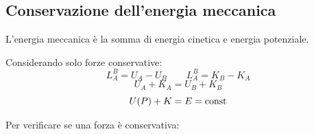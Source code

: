 \subsection{Conservazione dell'energia meccanica}
\begin{Def}
 L'energia meccanica è la somma di energia cinetica e energia potenziale.
\end{Def}
\begin{Teo}
Considerando solo forze conservative:
\begin{equation*}L_A^B=U_A-U_B\qquad L_A^B=K_B-K_A\end{equation*}
\begin{equation*}U_A+K_A=U_B+K_B\end{equation*}
\begin{equation*}U(P)+K=E=\text{const}\end{equation*}
\end{Teo}
Per verificare se una forza è conservativa:

